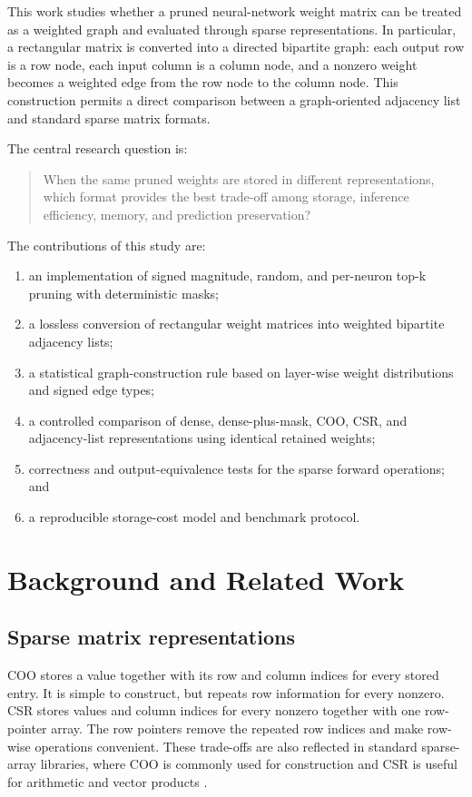 \documentclass[11pt]{article}
\begin{document}
This work studies whether a pruned neural-network weight matrix can be treated
as a weighted graph and evaluated through sparse representations.  In
particular, a rectangular matrix is converted into a directed bipartite graph:
each output row is a row node, each input column is a column node, and a
nonzero weight becomes a weighted edge from the row node to the column node.
This construction permits a direct comparison between a graph-oriented
adjacency list and standard sparse matrix formats.

The central research question is:
\begin{quote}
When the same pruned weights are stored in different representations, which
format provides the best trade-off among storage, inference efficiency, memory,
and prediction preservation?
\end{quote}

The contributions of this study are:
\begin{enumerate}
    \item an implementation of signed magnitude, random, and per-neuron top-k
    pruning with deterministic masks;
    \item a lossless conversion of rectangular weight matrices into weighted
    bipartite adjacency lists;
    \item a statistical graph-construction rule based on layer-wise weight
    distributions and signed edge types;
    \item a controlled comparison of dense, dense-plus-mask, COO, CSR, and
    adjacency-list representations using identical retained weights;
    \item correctness and output-equivalence tests for the sparse forward
    operations; and
    \item a reproducible storage-cost model and benchmark protocol.
\end{enumerate}

\section{Background and Related Work}

\subsection{Sparse matrix representations}

COO stores a value together with its row and column indices for every stored
entry.  It is simple to construct, but repeats row information for every
nonzero.  CSR stores values and column indices for every nonzero together with
one row-pointer array.  The row pointers remove the repeated row indices and
make row-wise operations convenient.  These trade-offs are also reflected in
standard sparse-array libraries, where COO is commonly used for construction
and CSR is useful for arithmetic and vector products \cite{scipycoo}.
\end{document}
